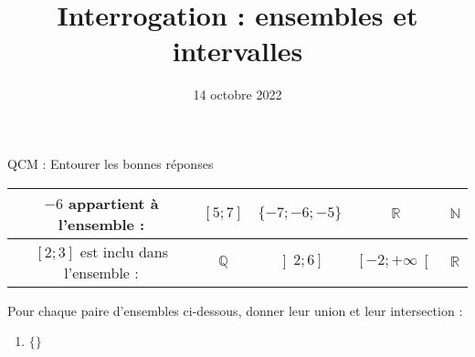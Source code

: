 \documentclass[
	classe=$2^{de}$,
	headerTitle=Interrogation
]{évaluation}
\title{Interrogation : ensembles et intervalles}
\date{14 octobre 2022}
\newcommand{\intervalle}[4]{\left#1 #2;#3\right#4}
\begin{document}
\maketitle

\begin{exercice} QCM : Entourer les bonnes réponses \vspace{1em}

	\renewcommand{\arraystretch}{1.5}
	\begin{center}
		\begin{tabular}{|c|c|c|c|c|}
			\hline
			$-6$ appartient à l'ensemble :                        & $\intervalle{[}{5}{7}{]}$ & $\{-7; -6;-5\}$           & $ℝ$                         & $ℕ$ \\ \hline
			$\intervalle{[}{2}{3}{]}$ est inclu dans l'ensemble : & $ℚ$                       & $\intervalle{]}{2}{6}{]}$ & $\intervalle{[}{-2}{+∞}{[}$ & $ℝ$ \\ \hline
		\end{tabular}
	\end{center}
\end{exercice}

\begin{exercice}
\end{exercice}

\begin{exercice}
	Pour chaque paire d'ensembles ci-dessous, donner leur union et leur intersection :
	\begin{enumerate}
		\item $\{\}$
	\end{enumerate}
\end{exercice}
\end{document}

